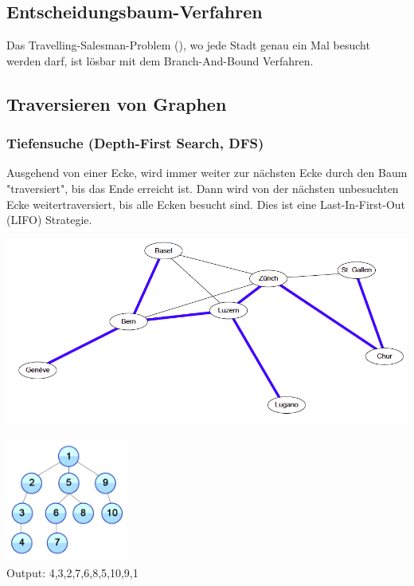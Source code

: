 \subsection{Entscheidungsbaum-Verfahren }
	Das Travelling-Salesman-Problem (), wo jede Stadt genau ein Mal besucht werden darf, ist lösbar mit dem Branch-And-Bound Verfahren.


\subsection{Traversieren von Graphen }

\begin{minipage}{0.5\textwidth}
	\subsubsection{Tiefensuche (Depth-First Search, DFS)}
		Ausgehend von einer Ecke, wird immer weiter zur nächsten Ecke durch den Baum "traversiert", bis das Ende erreicht ist. Dann wird von der nächsten unbesuchten Ecke weitertraversiert, bis alle Ecken besucht sind. Dies ist eine Last-In-First-Out (LIFO) Strategie.
		
		\includegraphics[width=\textwidth]{Content/Graphen/DFS.png}
		\begin{center}
		\includegraphics[width=0.3\textwidth]{Content/Graphen/tiefensuche.png}\\
		Output: 4,3,2,7,6,8,5,10,9,1\end{center}
\end{minipage}
